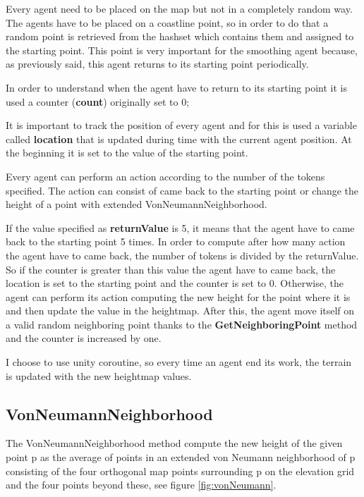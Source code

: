 \documentclass[12pt]{article}
\begin{document}
    Every agent need to be placed on the map but not in a completely random way. The agents have to be placed on a coastline point, so in order to do that a random point is retrieved
    from the hashset which contains them and assigned to the starting point. This point is very important for the smoothing agent because, as previously said, this agent returns
    to its starting point periodically.

    In order to understand when the agent have to return to its starting point it is used a counter (\textbf{count}) originally set to 0;
    
    It is important to track the position of every agent and for this is used a variable called \textbf{location} that is updated during time with the current agent position. 
    At the beginning it is set to the value of the starting point.

    Every agent can perform an action according to the number of the tokens specified. The action can consist of came back to the starting point or change the height of a point
    with extended VonNeumannNeighborhood.

    If the value specified as \textbf{returnValue} is 5, it means that the agent have to came back to the starting point 5 times. In order to compute after how many action the agent
    have to came back, the number of tokens is divided by the returnValue. So if the counter is greater than this value the agent have to came back, the location is set to the
    starting point and the counter is set to 0. Otherwise, the agent can perform its action computing the new height for the point where it is and then update the value in the heightmap.
    After this, the agent move itself on a valid random neighboring point thanks to the \textbf{GetNeighboringPoint} method and the counter is increased by one.

    I choose to use unity coroutine, so every time an agent end its work, the terrain is updated with the new heightmap values.

    \subsection{VonNeumannNeighborhood} \label{section:Von Neumann}
    The VonNeumannNeighborhood method compute the new height of the given point p as the average of points in an extended von Neumann neighborhood of p consisting of the
    four orthogonal map points surrounding p on the elevation grid and the four points beyond these, see figure \ref{fig:vonNeumann}.
\end{document}
